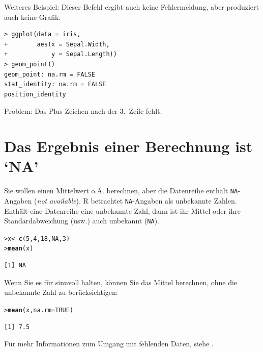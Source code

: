 \documentclass[oneside, 10pt]{book}\usepackage[]{graphicx}\usepackage[]{xcolor}
\makeatletter
\newcommand{\hlnum}[1]{\textcolor[rgb]{0.686,0.059,0.569}{#1}}%
\newcommand{\hlstd}[1]{\textcolor[rgb]{0.345,0.345,0.345}{#1}}%
\newcommand{\hlkwb}[1]{\textcolor[rgb]{0.69,0.353,0.396}{#1}}%
\newcommand{\hlkwc}[1]{\textcolor[rgb]{0.333,0.667,0.333}{#1}}%
\newcommand{\hlkwd}[1]{\textcolor[rgb]{0.737,0.353,0.396}{\textbf{#1}}}%
\newenvironment{kframe}{%
 \def\at@end@of@kframe{}%
 \ifinner\ifhmode%
  \def\at@end@of@kframe{\end{minipage}}%
  \begin{minipage}{\columnwidth}%
 \fi\fi%
 \def\FrameCommand##1{\hskip\@totalleftmargin \hskip-\fboxsep
 \colorbox{shadecolor}{##1}\hskip-\fboxsep
     \hskip-\linewidth \hskip-\@totalleftmargin \hskip\columnwidth}%
 \MakeFramed {\advance\hsize-\width
   \@totalleftmargin\z@ \linewidth\hsize
   \@setminipage}}%
 {\par\unskip\endMakeFramed%
 \at@end@of@kframe}
\newenvironment{knitrout}{}{} %
\makeatother
\begin{document}
Weiteres Beispiel: Dieser Befehl ergibt auch keine Fehlermeldung, aber produziert auch keine Grafik.
\begin{verbatim}
> ggplot(data = iris,
+        aes(x = Sepal.Width,
+            y = Sepal.Length))
> geom_point()
geom_point: na.rm = FALSE
stat_identity: na.rm = FALSE
position_identity
\end{verbatim}

Problem: Das Plus-Zeichen nach der 3.\ Zeile fehlt.

\section*{Das Ergebnis einer Berechnung ist `NA'}
Sie wollen einen Mittelwert o.Ä. berechnen, aber die
Datenreihe enthält \texttt{NA}-Angaben (\textit{not available}).
R betrachtet \texttt{NA}-Angaben als unbekannte Zahlen.
Enthält eine Datenreihe eine unbekannte Zahl,
dann ist ihr Mittel oder ihre Standardabweichung (usw.)
auch unbekannt (\texttt{NA}).
\begin{knitrout}
\color{fgcolor}\begin{kframe}
\begin{alltt}
\hlstd{> }\hlstd{x} \hlkwb{<-} \hlkwd{c}\hlstd{(}\hlnum{5}\hlstd{,} \hlnum{4}\hlstd{,} \hlnum{18}\hlstd{,} \hlnum{NA}\hlstd{,} \hlnum{3}\hlstd{)}
\hlstd{> }\hlkwd{mean}\hlstd{(x)}
\end{alltt}
\begin{verbatim}
[1] NA
\end{verbatim}
\end{kframe}
\end{knitrout}

Wenn Sie es für sinnvoll halten, können Sie das Mittel
berechnen, ohne die unbekannte Zahl zu berücksichtigen:
\begin{knitrout}
\color{fgcolor}\begin{kframe}
\begin{alltt}
\hlstd{> }\hlkwd{mean}\hlstd{(x,} \hlkwc{na.rm} \hlstd{=} \hlnum{TRUE}\hlstd{)}
\end{alltt}
\begin{verbatim}
[1] 7.5
\end{verbatim}
\end{kframe}
\end{knitrout}

Für mehr Informationen zum Umgang mit fehlenden Daten,
siehe \citet{Graham2009}.
\end{document}
